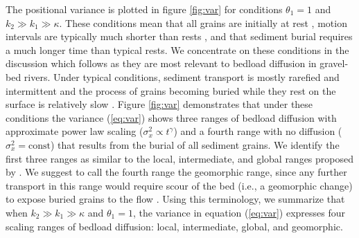 \documentclass[]{agujournal2018}
\begin{document}
The positional variance is plotted in figure \ref{fig:var} for conditions $\theta_1=1$ and $k_2\gg k_1 \gg \kappa$.
These conditions mean that all grains are initially at rest \citep[cf.][]{Wu2019}, motion intervals are typically much shorter than rests \citep[cf.][]{Einstein1937}, and that sediment burial requires a much longer time than typical rests.
We concentrate on these conditions in the discussion which follows as they are most relevant to bedload diffusion in gravel-bed rivers.
Under typical conditions, sediment transport is mostly rarefied and intermittent \citep{Frey2014} and the process of grains becoming buried while they rest on the surface is relatively slow \citep[e.g.][]{Hassan1994}.
Figure \ref{fig:var} demonstrates that under these conditions the variance (\ref{eq:var}) shows three ranges of bedload diffusion with approximate power law scaling ($\sigma_x^2 \propto t^\gamma$) and a fourth range with no diffusion ($\sigma_x^2 = \text{const}$) that results from the burial of all sediment grains. We identify the first three ranges as similar to the local, intermediate, and global ranges proposed by \citet{Nikora2001a,Nikora2002}.
We suggest to call the fourth range the geomorphic range, since any further transport in this range would require scour of the bed (i.e., a geomorphic change) to expose buried grains to the flow \citep[cf.][]{Nakagawa1980,Voepel2013,Martin2014}.
Using this terminology, we summarize that when $k_2\gg k_1 \gg \kappa$ and $\theta_1=1$, the variance in equation (\ref{eq:var}) expresses four scaling ranges of bedload diffusion: local, intermediate, global, and geomorphic.
\end{document}
